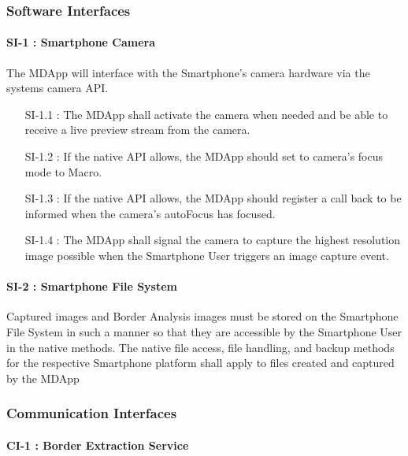         \subsubsection{Software Interfaces}

            \paragraph{SI-1 : Smartphone Camera }
                The MDApp will interface with the Smartphone's camera hardware via the systems camera API.

                \begin{itemize}[leftmargin=1.4cm]
                    \item[SI-1.1 : ] The MDApp shall activate the camera when needed and be able to receive a live preview stream from the camera.
                    \item[SI-1.2 : ] If the native API allows, the MDApp should set to camera’s focus mode to Macro.
                    \item[SI-1.3 : ] If the native API allows, the MDApp should register a call back to be informed when the camera’s autoFocus has focused.
                    \item[SI-1.4 : ] The MDApp shall signal the camera to capture the highest resolution image possible when the Smartphone User triggers an image capture event.

                \end{itemize}

            \paragraph{SI-2 : Smartphone File System }
                Captured images and Border Analysis images must be stored on the Smartphone File System in such a manner so that they are accessible by the Smartphone User in the native methods. The native file access, file handling, and backup methods for the respective Smartphone platform shall apply to files created and captured by the MDApp

        \subsubsection{Communication Interfaces}

            \paragraph{CI-1 : Border Extraction Service }

